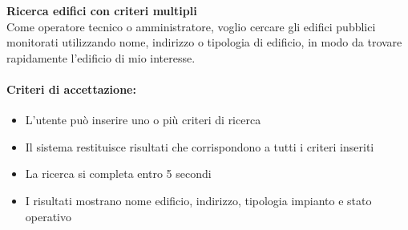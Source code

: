 \textbf{Ricerca edifici con criteri multipli} \\
Come operatore tecnico o amministratore, voglio cercare gli edifici pubblici monitorati utilizzando nome, indirizzo o tipologia di edificio, in modo da trovare rapidamente l'edificio di mio interesse.

\paragraph*{Criteri di accettazione:}
\begin{itemize}
    \item L'utente può inserire uno o più criteri di ricerca
    \item Il sistema restituisce risultati che corrispondono a tutti i criteri inseriti
    \item La ricerca si completa entro 5 secondi
    \item I risultati mostrano nome edificio, indirizzo, tipologia impianto e stato operativo
\end{itemize}

